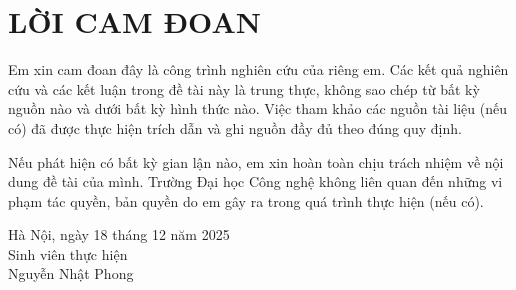 \chapter*{LỜI CAM ĐOAN}

\vspace{1cm}

Em xin cam đoan đây là công trình nghiên cứu của riêng em. Các kết quả nghiên cứu và các kết luận trong đề tài này là trung thực, không sao chép từ bất kỳ nguồn nào và dưới bất kỳ hình thức nào. Việc tham khảo các nguồn tài liệu (nếu có) đã được thực hiện trích dẫn và ghi nguồn đầy đủ theo đúng quy định.

Nếu phát hiện có bất kỳ gian lận nào, em xin hoàn toàn chịu trách nhiệm về nội dung đề tài của mình. Trường Đại học Công nghệ không liên quan đến những vi phạm tác quyền, bản quyền do em gây ra trong quá trình thực hiện (nếu có).

\vspace{3cm}

\begin{flushright}
Hà Nội, ngày 18 tháng 12 năm 2025\\
Sinh viên thực hiện\\
\vspace{2cm}
Nguyễn Nhật Phong
\end{flushright}
